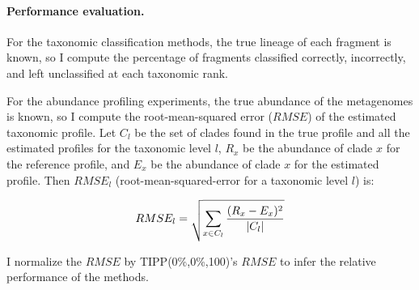 \paragraph{\bf Performance evaluation. }
For the taxonomic
classification methods, the true lineage of each fragment is known, 
so I compute the  percentage of fragments classified correctly, incorrectly, and left unclassified at each taxonomic rank.

For the abundance profiling experiments, the true abundance 
of the metagenomes is known, so I
compute  the root-mean-squared error 
($RMSE$) of the estimated taxonomic profile. 
Let ${C_l}$ be the set of clades found in the true profile and all the estimated profiles for the taxonomic level $l$, $R_x$ be the abundance of clade $x$ for the reference profile, and $E_x$ be the abundance of clade $x$ for the estimated profile.  Then $RMSE_l$ (root-mean-squared-error for a taxonomic level $l$) is:

\begin{equation}
RMSE_l = \sqrt {\sum_{x\in{C_l}} \frac{(R_x-E_x)^2}{|C_l|}}\\
\end{equation}

\noindent
I normalize the $RMSE$ by TIPP(0\%,0\%,100)'s $RMSE$ to infer the relative performance of the methods.  

